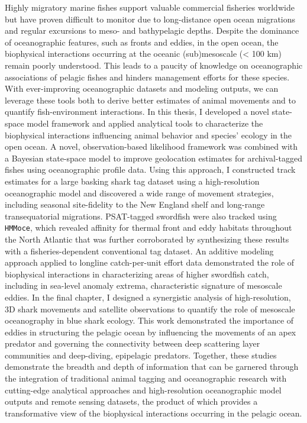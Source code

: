 Highly migratory marine fishes support valuable commercial fisheries worldwide but have proven difficult to monitor due to long-distance open ocean migrations and regular excursions to meso- and bathypelagic depths. Despite the dominance of oceanographic features, such as fronts and eddies, in the open ocean, the biophysical interactions occurring at the oceanic (sub)mesoscale (< 100 km) remain poorly understood. This leads to a paucity of knowledge on oceanographic associations of pelagic fishes and hinders management efforts for these species. With ever-improving oceanographic datasets and modeling outputs, we can leverage these tools both to derive better estimates of animal movements and to quantify fish-environment interactions. In this thesis, I developed a novel state-space model framework and applied analytical tools to characterize the biophysical interactions influencing animal behavior and species' ecology in the open ocean. A novel, observation-based likelihood framework was combined with a Bayesian state-space model to improve geolocation estimates for archival-tagged fishes using oceanographic profile data. Using this approach, I constructed track estimates for a large basking shark tag dataset using a high-resolution oceanographic model and discovered a wide range of movement strategies, including seasonal site-fidelity to the New England shelf and long-range transequatorial migrations. PSAT-tagged swordfish were also tracked using \texttt{HMMoce}, which revealed affinity for thermal front and eddy habitats throughout the North Atlantic that was further corroborated by synthesizing these results with a fisheries-dependent conventional tag dataset. An additive modeling approach applied to longline catch-per-unit effort data demonstrated the role of biophysical interactions in characterizing areas of higher swordfish catch, including in sea-level anomaly extrema, characteristic signature of mesoscale eddies. In the final chapter, I designed a synergistic analysis of high-resolution, 3D shark movements and satellite observations to quantify the role of mesoscale oceanography in blue shark ecology. This work demonstrated the importance of eddies in structuring the pelagic ocean by influencing the movements of an apex predator and governing the connectivity between deep scattering layer communities and deep-diving, epipelagic predators. Together, these studies demonstrate the breadth and depth of information that can be garnered through the integration of traditional animal tagging and oceanographic research with cutting-edge analytical approaches and high-resolution oceanographic model outputs and remote sensing datasets, the product of which provides a transformative view of the biophysical interactions occurring in the pelagic ocean.